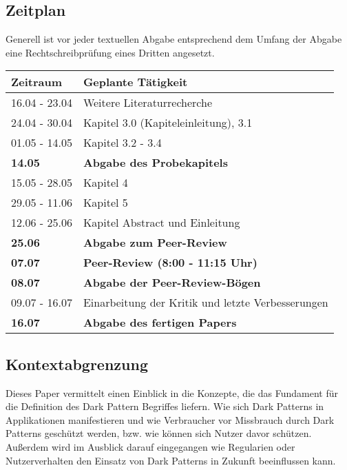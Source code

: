 \documentclass[conference,compsoc,final,a4paper]{IEEEtran}
\begin{document}
\subsection{Zeitplan}
Generell ist vor jeder textuellen Abgabe entsprechend dem Umfang der Abgabe eine Rechtschreibprüfung eines Dritten angesetzt.
\begin{table}[H]
\begin{tabular*}{\linewidth}{ @{\extracolsep{\fill}}l  l}
    \toprule
\textbf{Zeitraum}                   & \textbf{Geplante Tätigkeit}       \\
    \midrule
16.04 - 23.04                       & Weitere Literaturrecherche        \\
24.04 - 30.04                       & Kapitel 3.0 (Kapiteleinleitung), 3.1                          \\
01.05 - 14.05                       & Kapitel 3.2 - 3.4                          \\
\textbf{14.05}                      & \textbf{Abgabe des Probekapitels} \\
15.05 - 28.05                       & Kapitel 4                           \\
29.05 - 11.06                       & Kapitel 5                          \\
12.06 - 25.06                       & Kapitel Abstract und Einleitung                          \\
\textbf{25.06}                      & \textbf{Abgabe zum Peer-Review}   \\
\textbf{07.07}                      & \textbf{Peer-Review (8:00 - 11:15 Uhr)} \\
\textbf{08.07}                      & \textbf{Abgabe der Peer-Review-Bögen}   \\
09.07 - 16.07                       & Einarbeitung der Kritik und letzte Verbesserungen                           \\
\textbf{16.07}                      & \textbf{Abgabe des fertigen Papers}      \\
    \bottomrule
\end{tabular*}
\end{table}

\subsection{Kontextabgrenzung}
Dieses Paper vermittelt einen Einblick in die Konzepte, die das Fundament für die Definition des Dark Pattern Begriffes liefern. Wie sich Dark Patterns in Applikationen manifestieren und wie Verbraucher vor Missbrauch durch Dark Patterns geschützt werden, bzw. wie können sich Nutzer davor schützen. Außerdem wird im Ausblick darauf eingegangen wie Regularien oder Nutzerverhalten den Einsatz von Dark Patterns in Zukunft beeinflussen kann.
\end{document}
